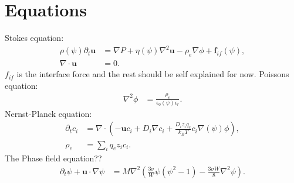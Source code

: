 \documentclass[a4paper,10pt]{article}
\numberwithin{equation}{section}
\numberwithin{figure}{section}
\begin{document}
\section{Equations}
Stokes equation:
\begin{align}
\rho(\psi) \partial_t \mathbf{u}  &=  \nabla P +\eta(\psi) \nabla^2 \mathbf{u} -  \rho_e  \nabla \phi + \mathbf{f}_{if}(\psi),  \\  
\nabla \cdot\mathbf{u} &= 0.
\end{align}
$f_{if}$ is the interface force and the rest should be self explained for now. \newline
Poissons equation: 
\begin{align}
\nabla^2 \phi &= \frac{\rho_e}{\epsilon_0(\psi) \epsilon_r}.
\end{align}
Nernst-Planck equation:
\begin{align}
\partial_t c_i  &=  \nabla  \cdot  \left( - \mathbf{u} c_i  + D_i \nabla c_i  +   \frac{D_i z_i q_e}{k_B T} c_i \nabla(\psi) \phi \right), \\
\rho_e &= \sum_i q_e z_i c_i. 
\end{align}
The Phase field equation?? 
\begin{align}
\partial_t \psi + \mathbf{u}\cdot\nabla\psi &= M\nabla^2\left(\frac{3 \sigma }{W} \psi \left(\psi^2 -1\right) - \frac{3 \sigma W}{8}\nabla^2 \psi\right).
\end{align}
\end{document}
